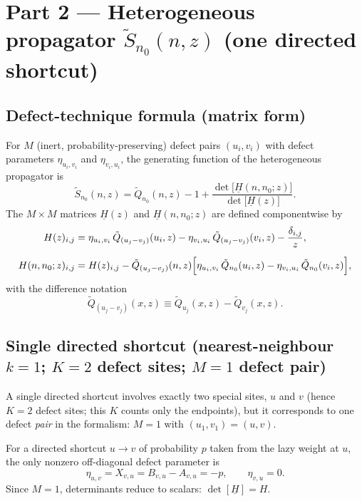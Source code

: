 \documentclass[11pt]{article}
\begin{document}
\section{Part 2 --- Heterogeneous propagator $\tilde S_{n_0}(n,z)$ (one directed shortcut)}

\subsection{Defect-technique formula (matrix form)}

For $M$ (inert, probability-preserving) defect pairs $(u_i,v_i)$ with defect parameters $\eta_{u_i,v_i}$ and $\eta_{v_i,u_i}$,
the generating function of the heterogeneous propagator is
\begin{equation}
\tilde S_{n_0}(n,z)
=
\tilde Q_{n_0}(n,z)-1+\frac{\det\!\bigl[\underline{H}(n,n_0;z)\bigr]}{\det\!\bigl[\underline{H}(z)\bigr]}.
\label{eq:defect_formula}
\end{equation}
The $M\times M$ matrices $\underline{H}(z)$ and $\underline{H}(n,n_0;z)$ are defined componentwise by
\begin{align}
H(z)_{i,j}
&=
\eta_{u_i,v_i}\,\tilde Q_{(u_j-v_j)}(u_i,z)
-\eta_{v_i,u_i}\,\tilde Q_{(u_j-v_j)}(v_i,z)
-\frac{\delta_{i,j}}{z},
\label{eq:H_def}\\[2mm]
H(n,n_0;z)_{i,j}
&=
H(z)_{i,j}
-\tilde Q_{(u_j-v_j)}(n,z)\Bigl[
\eta_{u_i,v_i}\,\tilde Q_{n_0}(u_i,z)
-\eta_{v_i,u_i}\,\tilde Q_{n_0}(v_i,z)
\Bigr],
\label{eq:Hn_def}
\end{align}
with the difference notation
\[
\tilde Q_{(u_j-v_j)}(x,z)\equiv \tilde Q_{u_j}(x,z)-\tilde Q_{v_j}(x,z).
\]

\subsection{Single directed shortcut (nearest-neighbour $k=1$; $K=2$ defect sites; $M=1$ defect pair)}

A single directed shortcut involves exactly two special sites, $u$ and $v$ (hence $K=2$ defect sites; this $K$ counts only the endpoints),
but it corresponds to one defect \emph{pair} in the formalism: $M=1$ with $(u_1,v_1)=(u,v)$.

For a directed shortcut $u\to v$ of probability $p$ taken from the lazy weight at $u$, the only nonzero off-diagonal defect
parameter is
\[
\eta_{u,v}=X_{v,u}=B_{v,u}-A_{v,u}=-p,\qquad \eta_{v,u}=0.
\]
Since $M=1$, determinants reduce to scalars: $\det[\underline{H}]=H$.
\end{document}
